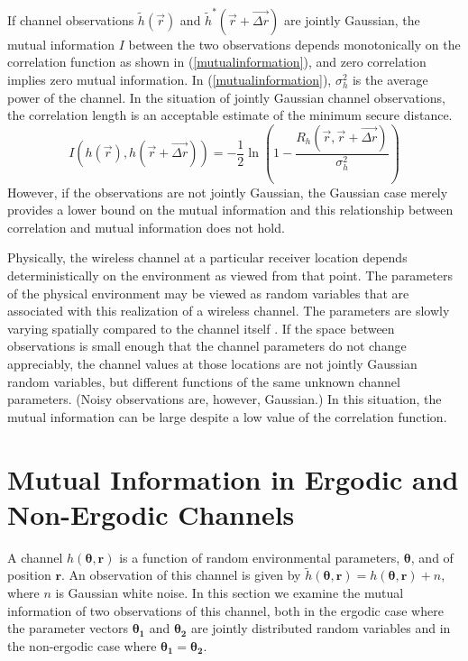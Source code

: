 \documentclass[conference]{ieeetran}
\begin{document}
If channel observations $\tilde{h}(\vec{r})$ and $\tilde{h}^*(\vec{r}+\vec{\Delta r})$ are jointly Gaussian, the mutual information $I$ between the two observations depends monotonically on the correlation function as shown in (\ref{mutualinformation}), and zero correlation implies zero mutual information.  In   (\ref{mutualinformation}), $\sigma_h^2$ is the average power of the channel.  In the situation of jointly Gaussian channel observations, the correlation length is an acceptable estimate of the minimum secure distance.
\begin{equation}\label{mutualinformation}
I(h(\vec{r}),h(\vec{r}+\vec{\Delta r})) = -\frac{1}{2}\ln\left(1-\frac{R_h(\vec{r},\vec{r}+\vec{\Delta r})}{\sigma_h^2}\right)
\end{equation}
However, if the observations are not jointly Gaussian, the Gaussian case merely provides a lower bound on the mutual information and this relationship between correlation and mutual information does not hold. %

Physically, the wireless channel  at a particular receiver location depends deterministically on the environment as viewed from that point.  The parameters of the physical environment may be viewed as random variables that are associated with this realization of a wireless channel.  The parameters are slowly varying spatially compared to the channel itself \cite{jakes1974, duel-hallen2007}.  If the space between observations is small enough that the channel parameters do not change appreciably, the channel values at those locations are not jointly Gaussian random variables, but different functions of the same unknown channel parameters.  (Noisy observations are, however, Gaussian.)  In this situation, the mutual information can be large despite a low value of the correlation function.

\section{Mutual Information in Ergodic and Non-Ergodic Channels}\label{mutualinf}
A channel $h(\boldsymbol{\theta},\mathbf{r})$ is a function of random environmental parameters, $\boldsymbol{\theta}$, and of position $\mathbf{r}$.  An observation of this channel is given by $\tilde{h}(\boldsymbol{\theta},\mathbf{r})=h(\boldsymbol{\theta},\mathbf{r})+n$, where $n$ is Gaussian white noise.  In this section we examine the mutual information of two observations of this channel, both in the ergodic case where the parameter vectors $\boldsymbol{\theta_1}$ and $\boldsymbol{\theta_2}$ are jointly distributed random variables and in the non-ergodic case where $\boldsymbol{\theta_1}=\boldsymbol{\theta_2}$.  
\end{document}
